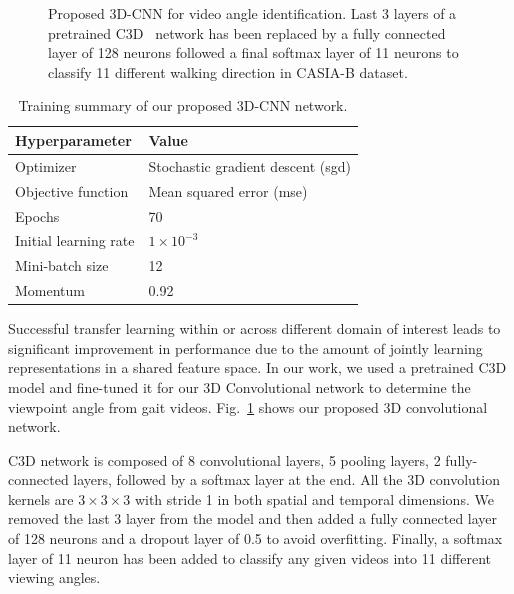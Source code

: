 \begin{figure}
	\caption[Proposed 3D-CNN for video angle identification]
	{Proposed 3D-CNN for video angle identification. Last 3 layers of a pretrained C3D~\cite{Tran_15} network has been replaced by a fully connected layer of 128 neurons followed a final softmax layer of 11 neurons to classify 11 different walking direction in CASIA-B dataset. \label{fig:3D_CNN}
	}
	
\end{figure}

\begin{table}
	\centering
	\caption{Training summary of our proposed 3D-CNN network.  \label{table:summary_3dcnn}}
	\begin{tabular*}{30pc}{@{\extracolsep{\fill}}ll@{}}
			\hline \noalign{\vspace{3pt}}
			\textbf{Hyperparameter} & \textbf{Value} \\ \hline\noalign{\vspace{3pt}}
			Optimizer  &Stochastic gradient descent (\gls{sgd})  \\ [3pt]
			Objective function  &Mean squared error (\gls{mse}) \\ [3pt]
			Epochs  &70  \\ [3pt]
			Initial learning rate & $1 \times 10^{-3}$ \\ [3pt]
			Mini-batch size	  &12  \\ [3pt]
			Momentum  &0.92 \\ [3pt]
			\hline
	\end{tabular*}
\end{table}

Successful transfer learning within or across different domain of interest leads to significant improvement in performance due to the amount of jointly learning representations in a shared feature space. In our work, we used a pretrained C3D model and fine-tuned it for our 3D Convolutional network to determine the viewpoint angle from gait videos. Fig.~\ref{fig:3D_CNN} shows our proposed 3D convolutional network. 

C3D network is composed of 8 convolutional layers, 5 pooling layers, 2 fully-connected layers, followed by a softmax layer at the end. All the 3D convolution kernels are $3\times3\times3$ with stride 1 in both spatial and temporal dimensions. We removed the last 3 layer from the model and then added a fully connected layer of 128 neurons and a dropout layer of 0.5 to avoid overfitting. Finally, a softmax layer of 11 neuron has been added to classify any given videos into 11 different viewing angles. 


